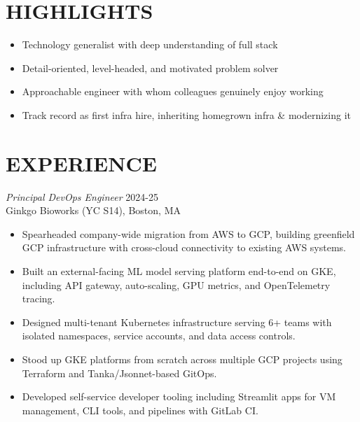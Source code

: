 \documentclass[line,margin]{res}
\begin{document}
\address{}
\address{}

\begin{resume}

\section{HIGHLIGHTS}
  \begin{itemize}  \itemsep -2pt %
    \item Technology generalist with deep understanding of full stack
    \item Detail-oriented, level-headed, and motivated problem solver
    \item Approachable engineer with whom colleagues genuinely enjoy working
    \item Track record as first infra hire, inheriting homegrown infra \& modernizing it
  \end{itemize}

\section{EXPERIENCE}
  \textsl{Principal DevOps Engineer}  \hfill 2024-25 \\
  Ginkgo Bioworks {\scriptsize\textsf{(YC S14)}},
  Boston, MA
  \begin{itemize}  \itemsep -2pt %
    \item Spearheaded company-wide migration from AWS to GCP, building greenfield GCP infrastructure with cross-cloud connectivity to existing AWS systems.
    \item Built an external-facing ML model serving platform end-to-end on GKE, including API gateway, auto-scaling, GPU metrics, and OpenTelemetry tracing.
    \item Designed multi-tenant Kubernetes infrastructure serving 6+ teams with isolated namespaces, service accounts, and data access controls.
    \item Stood up GKE platforms from scratch across multiple GCP projects using Terraform and Tanka/Jsonnet-based GitOps.
    \item Developed self-service developer tooling including Streamlit apps for VM management, CLI tools, and pipelines with GitLab CI.
  \end{itemize}


\end{resume}
\end{document}
